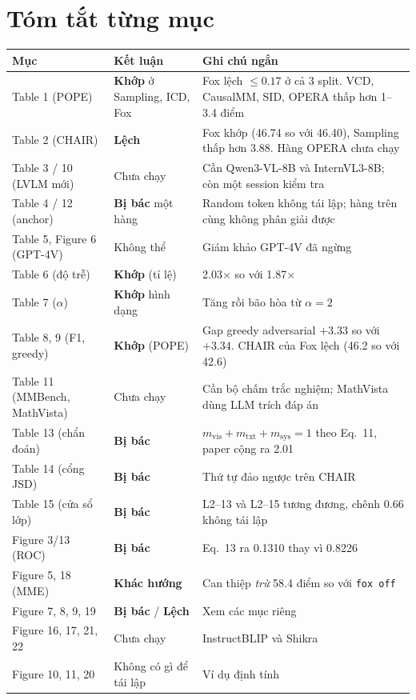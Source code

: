 \documentclass[10pt,a4paper]{article}
\newcommand{\ok}[1]{\textcolor{okc}{\textbf{#1}}}
\newcommand{\bad}[1]{\textcolor{badc}{\textbf{#1}}}
\newcommand{\warn}[1]{\textcolor{warnc}{\textbf{#1}}}
\newcommand{\mute}[1]{\textcolor{mutec}{#1}}
\begin{document}
\section{Tóm tắt từng mục}
\begin{center}\small
\begin{tabular}{@{}l L{5.2cm} L{7.4cm}@{}}
\toprule
Mục & Kết luận & Ghi chú ngắn \\
\midrule
Table 1 (POPE) & \ok{Khớp} ở Sampling, ICD, Fox & Fox lệch $\le 0.17$ ở cả 3 split. VCD, CausalMM, SID, OPERA thấp hơn 1--3.4 điểm \\
Table 2 (CHAIR) & \warn{Lệch} & Fox khớp (46.74 so với 46.40), Sampling thấp hơn 3.88. Hàng OPERA chưa chạy \\
Table 3 / 10 (LVLM mới) & \mute{Chưa chạy} & Cần Qwen3-VL-8B và InternVL3-8B; còn một session kiểm tra \\
Table 4 / 12 (anchor) & \bad{Bị bác} một hàng & Random token không tái lập; hàng trên cùng không phân giải được \\
Table 5, Figure 6 (GPT-4V) & \mute{Không thể} & Giám khảo GPT-4V đã ngừng \\
Table 6 (độ trễ) & \ok{Khớp} (tỉ lệ) & 2.03$\times$ so với 1.87$\times$ \\
Table 7 ($\alpha$) & \ok{Khớp} hình dạng & Tăng rồi bão hòa từ $\alpha=2$ \\
Table 8, 9 (F1, greedy) & \ok{Khớp} (POPE) & Gap greedy adversarial $+3.33$ so với $+3.34$. CHAIR của Fox lệch (46.2 so với 42.6) \\
Table 11 (MMBench, MathVista) & \mute{Chưa chạy} & Cần bộ chấm trắc nghiệm; MathVista dùng LLM trích đáp án \\
Table 13 (chẩn đoán) & \bad{Bị bác} & $m_{\mathrm{vis}}+m_{\mathrm{txt}}+m_{\mathrm{sys}}=1$ theo Eq.~11, paper cộng ra 2.01 \\
Table 14 (cổng JSD) & \bad{Bị bác} & Thứ tự đảo ngược trên CHAIR \\
Table 15 (cửa sổ lớp) & \bad{Bị bác} & L2--13 và L2--15 tương đương, chênh 0.66 không tái lập \\
Figure 3/13 (ROC) & \bad{Bị bác} & Eq.~13 ra 0.1310 thay vì 0.8226 \\
Figure 5, 18 (MME) & \warn{Khác hướng} & Can thiệp \emph{trừ} 58.4 điểm so với \texttt{fox off} \\
Figure 7, 8, 9, 19 & \bad{Bị bác} / \warn{Lệch} & Xem các mục riêng \\
Figure 16, 17, 21, 22 & \mute{Chưa chạy} & InstructBLIP và Shikra \\
Figure 10, 11, 20 & \mute{Không có gì để tái lập} & Ví dụ định tính \\
\bottomrule
\end{tabular}
\end{center}
\end{document}
